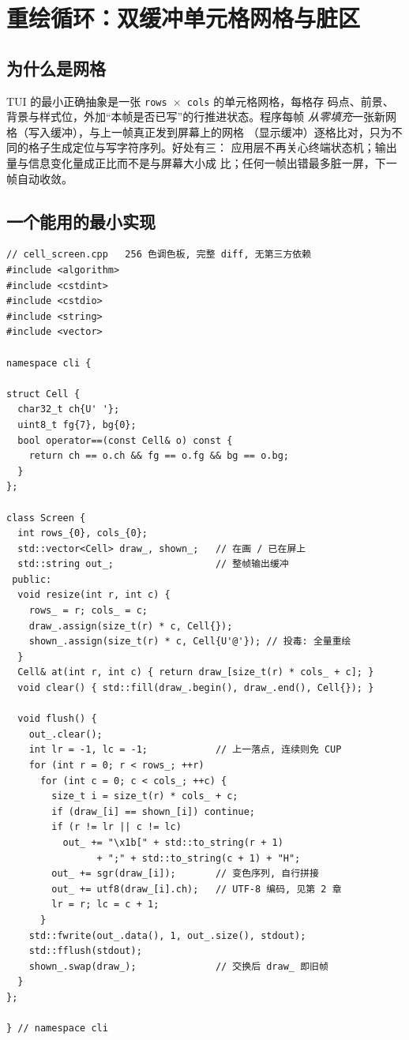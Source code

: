 \documentclass[12pt,a4paper,fontset=fandol]{ctexbook}
\newcommand{\Tp}[1]{\texttt{#1}}
\begin{document}
\section{重绘循环：双缓冲单元格网格与脏区}

\subsection{为什么是网格}

TUI 的最小正确抽象是一张 \Tp{rows $\times$ cols} 的单元格网格，每格存
码点、前景、背景与样式位，外加``本帧是否已写''的行推进状态。程序每帧
\emph{从零填充}一张新网格（写入缓冲），与上一帧真正发到屏幕上的网格
（显示缓冲）逐格比对，只为不同的格子生成定位与写字符序列。好处有三：
应用层不再关心终端状态机；输出量与信息变化量成正比而不是与屏幕大小成
比；任何一帧出错最多脏一屏，下一帧自动收敛。

\subsection{一个能用的最小实现}

\begin{lstlisting}[caption={双缓冲网格与差异刷新（cell\_screen.cpp，约 45 行）}]
// cell_screen.cpp   256 色调色板, 完整 diff, 无第三方依赖
#include <algorithm>
#include <cstdint>
#include <cstdio>
#include <string>
#include <vector>

namespace cli {

struct Cell {
  char32_t ch{U' '};
  uint8_t fg{7}, bg{0};
  bool operator==(const Cell& o) const {
    return ch == o.ch && fg == o.fg && bg == o.bg;
  }
};

class Screen {
  int rows_{0}, cols_{0};
  std::vector<Cell> draw_, shown_;   // 在画 / 已在屏上
  std::string out_;                  // 整帧输出缓冲
 public:
  void resize(int r, int c) {
    rows_ = r; cols_ = c;
    draw_.assign(size_t(r) * c, Cell{});
    shown_.assign(size_t(r) * c, Cell{U'@'}); // 投毒: 全量重绘
  }
  Cell& at(int r, int c) { return draw_[size_t(r) * cols_ + c]; }
  void clear() { std::fill(draw_.begin(), draw_.end(), Cell{}); }

  void flush() {
    out_.clear();
    int lr = -1, lc = -1;            // 上一落点, 连续则免 CUP
    for (int r = 0; r < rows_; ++r)
      for (int c = 0; c < cols_; ++c) {
        size_t i = size_t(r) * cols_ + c;
        if (draw_[i] == shown_[i]) continue;
        if (r != lr || c != lc)
          out_ += "\x1b[" + std::to_string(r + 1)
                + ";" + std::to_string(c + 1) + "H";
        out_ += sgr(draw_[i]);       // 变色序列, 自行拼接
        out_ += utf8(draw_[i].ch);   // UTF-8 编码, 见第 2 章
        lr = r; lc = c + 1;
      }
    std::fwrite(out_.data(), 1, out_.size(), stdout);
    std::fflush(stdout);
    shown_.swap(draw_);              // 交换后 draw_ 即旧帧
  }
};

} // namespace cli
\end{lstlisting}
\end{document}
